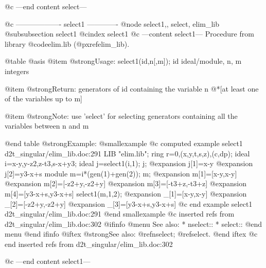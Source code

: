 @c ---end content select---

@c ------------------- select1 -------------
@node select1,, select, elim_lib
@subsubsection select1
@cindex select1
@c ---content select1---
Procedure from library @code{elim.lib} (@pxref{elim_lib}).

@table @asis
@item @strong{Usage:}
select1(id,n[,m]); id ideal/module, n, m integers

@item @strong{Return:}
generators of id containing the variable n
@*[at least one of the variables up to m]

@item @strong{Note:}
use 'select' for selecting generators containing all the
variables between n and m

@end table
@strong{Example:}
@smallexample
@c computed example select1 d2t_singular/elim_lib.doc:291 
LIB "elim.lib";
ring r=0,(x,y,t,s,z),(c,dp);
ideal i=x-y,y-z2,z-t3,s-x+y3;
ideal j=select1(i,1);
j;
@expansion{} j[1]=x-y
@expansion{} j[2]=y3-x+s
module m=i*(gen(1)+gen(2));
m;
@expansion{} m[1]=[x-y,x-y]
@expansion{} m[2]=[-z2+y,-z2+y]
@expansion{} m[3]=[-t3+z,-t3+z]
@expansion{} m[4]=[y3-x+s,y3-x+s]
select1(m,1,2);
@expansion{} _[1]=[x-y,x-y]
@expansion{} _[2]=[-z2+y,-z2+y]
@expansion{} _[3]=[y3-x+s,y3-x+s]
@c end example select1 d2t_singular/elim_lib.doc:291
@end smallexample
@c inserted refs from d2t_singular/elim_lib.doc:302
@ifinfo
@menu
See also:
* nselect::
* select::
@end menu
@end ifinfo
@iftex
@strong{See also:}
@ref{nselect};
@ref{select}.
@end iftex
@c end inserted refs from d2t_singular/elim_lib.doc:302

@c ---end content select1---
